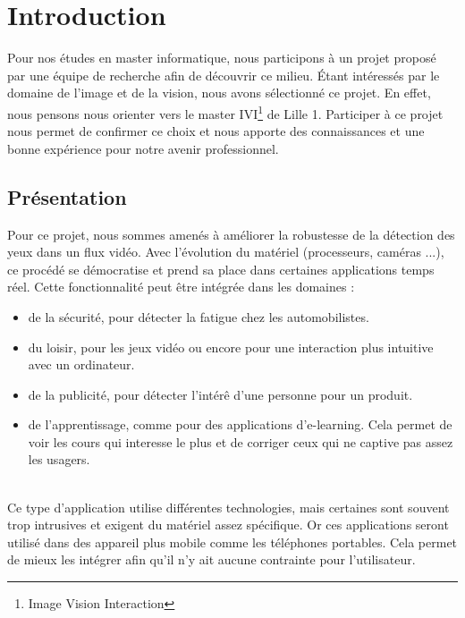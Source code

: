 \section{Introduction}

Pour nos études en master informatique, nous participons à un projet proposé par une 
équipe de recherche afin de découvrir ce milieu. 
Étant intéressés par le domaine de l'image et de la vision, nous avons sélectionné ce projet. 
En effet, nous pensons nous orienter vers le master IVI\footnote{Image Vision Interaction} de 
Lille 1. Participer à ce projet nous permet de confirmer ce choix et nous apporte des 
connaissances et une bonne expérience pour notre avenir professionnel.

\subsection{Présentation}
Pour ce projet, nous sommes amenés à améliorer la robustesse de la détection des yeux dans un flux vidéo.
Avec l'évolution du matériel (processeurs, caméras ...), ce procédé se démocratise et prend sa place 
dans certaines applications temps réel. Cette fonctionnalité peut être intégrée dans les domaines : 
\begin{itemize}
 \item de la sécurité, pour détecter la fatigue chez les automobilistes.
 \item du loisir, pour les jeux vidéo ou encore pour une interaction plus intuitive avec un ordinateur.
 \item de la publicité, pour détecter l'intérê d'une personne pour un produit. 
 \item de l'apprentissage, comme pour des applications d'e-learning. Cela permet de voir les cours
 qui interesse le plus et de corriger ceux qui ne captive pas assez les usagers.
\end{itemize}
\ \\
Ce type d'application utilise différentes technologies, mais certaines sont souvent trop intrusives 
et exigent du matériel assez spécifique. Or ces applications seront utilisé dans des appareil plus mobile
comme les téléphones portables. Cela permet de mieux les intégrer afin qu'il n'y ait aucune contrainte pour l'utilisateur.


